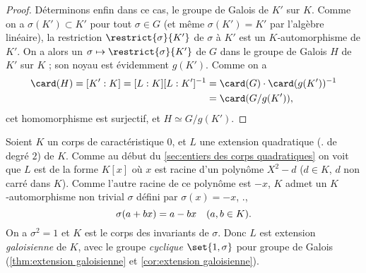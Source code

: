 \documentclass[11pt, useosf,
  title in boldface,
  theorem in new line,
  theorem numbering = section,
  number theorems separately,
]{simplivre}
\begin{document}
\begin{proof}
        Déterminons enfin dans ce cas, le groupe de Galois de \( K' \) sur \( K \). Comme on a \( \sigma(K') \subset K' \) pour tout \( \sigma \in G \) (et même \( \sigma(K') = K' \) par l'algèbre linéaire), la restriction \( \restrict{\sigma}{K'} \) de \( \sigma \) à \( K' \) est un \( K \)‑automorphisme de \( K' \). On a alors un  \( \sigma \mapsto \restrict{\sigma}{K'} \) de \( G \) dans le groupe de Galois \( H \) de \( K' \) sur \( K \) ; son noyau est évidemment \( g(K') \). Comme on a
        \begin{align*}
            \card(H) = [K':K] = [L:K][L:K']^{-1} &= \card(G) \cdot \card(g(K'))^{-1}\\
            &= \card(G/g(K')),
        \end{align*}
        cet homomorphisme est surjectif, et \( H \simeq G/g(K') \).
    \end{proof}

\smallskip
    \begin{example*}
        Soient \( K \) un corps de caractéristique \( 0 \), et \( L \) une extension quadratique (\ie. de degré \( 2 \)) de \( K \). Comme au début du \cref{sec:entiers des corps quadratiques} on voit que \( L \) est de la forme \( K[x] \) où \( x \) est racine d'un polynôme \( X^2-d \) (\( d \in K \), \( d \) non carré dans \( K \)). Comme l'autre racine de ce polynôme est \( -x \), \( K \) admet un \( K \)‑automorphisme non trivial \( \sigma \) défini par \( \sigma(x) = -x \), \ie.,
        \begin{equation}
            \sigma(a+bx) = a-bx \quad \text{(\( a,b \in K \))}.
        \end{equation}
        On a \( \sigma^2 = 1 \) et \( K \) est le corps des invariants de \( \sigma \). Donc \( L \) est extension \emph{galoisienne} de \( K \), avec le groupe \emph{cyclique} \( \set{1, \sigma} \) pour groupe de Galois (\cref{thm:extension galoisienne} et \cref{cor:extension galoisienne}).
    \end{example*}
\end{document}
